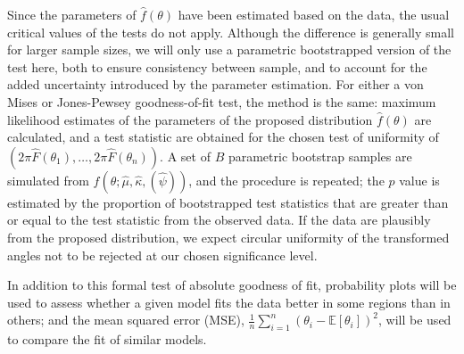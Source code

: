 \documentclass[../../ArchStats.tex]{subfiles}
\begin{document}
Since the parameters of $\hat{f}(\theta)$ have been estimated based on the data, the usual critical values of the tests do not apply. Although the difference is generally small for larger sample sizes, we will only use a parametric bootstrapped version of the test here,  both to ensure consistency between sample, and to account for the added uncertainty introduced by the parameter estimation. For either a von Mises or Jones-Pewsey goodness-of-fit test, the method is the same: maximum likelihood estimates of the parameters of the proposed distribution $\hat{f}(\theta)$ are calculated, and a test statistic are obtained for the chosen test of uniformity of $( 2\pi \hat{F}(\theta_1), \dots, 2\pi \hat{F}(\theta_n) )$. A set of $B$ parametric bootstrap samples are simulated from $\hat{f}(\theta; \hat{\mu}, \hat{\kappa}, (\hat{\psi}))$, and the procedure is repeated; the $p$ value is estimated by the proportion of bootstrapped test statistics that are greater than or equal to the test statistic from the observed data. If the data are plausibly from the proposed distribution, we expect circular uniformity of the transformed angles not to be rejected at our chosen significance level.

In addition to this formal test of absolute goodness of fit, probability plots will be used to assess whether a given model fits the data better in some regions than in others; and the mean squared error (MSE), $\frac{1}{n} \sum_{i=1}^n (\theta_i - \mathbb{E}\left[\theta_i\right])^2$, will be used to compare the fit of similar models.


\end{document}
